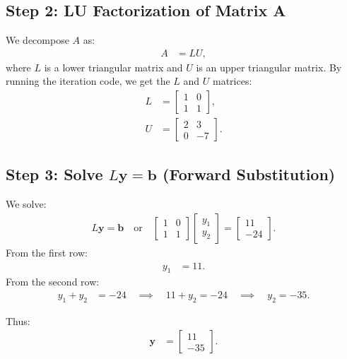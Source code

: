 \documentclass[journal]{IEEEtran}
\begin{document}
\subsection*{Step 2: LU Factorization of Matrix A}
We decompose $A$ as:
\begin{align}
A &= LU,
\end{align}
where $L$ is a lower triangular matrix and $U$ is an upper triangular matrix.
By running the iteration code, we get the $L$ and $U$ matrices:
\begin{align}
L &= \begin{bmatrix} 1 & 0 \\ 1 & 1 \end{bmatrix}, \\
U &= \begin{bmatrix} 2 & 3 \\ 0 & -7 \end{bmatrix}.
\end{align}

\subsection*{Step 3: Solve $L\mathbf{y} = \mathbf{b}$ (Forward Substitution)}
We solve:
\begin{align}
L\mathbf{y} = \mathbf{b} \quad \text{or} \quad \begin{bmatrix} 1 & 0 \\ 1 & 1 \end{bmatrix} \begin{bmatrix} y_1 \\ y_2 \end{bmatrix} = \begin{bmatrix} 11 \\ -24 \end{bmatrix}.
\end{align}
From the first row:
\begin{align}
y_1 &= 11.
\end{align}
From the second row:
\begin{align}
y_1 + y_2 &= -24 \quad \implies \quad 11 + y_2 = -24 \quad \implies \quad y_2 = -35.
\end{align}

Thus:
\begin{align}
\mathbf{y} &= \begin{bmatrix} 11 \\ -35 \end{bmatrix}.
\end{align}
\end{document}
